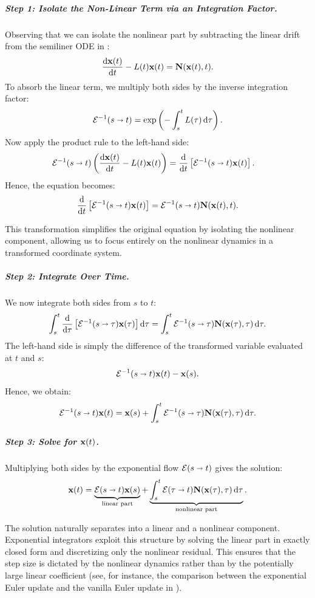 \subparagraph{Step 1: Isolate the Non-Linear Term via an Integration Factor.}
Observing that we can isolate the nonlinear part by subtracting the linear drift from the semiliner ODE in :
\[
\frac{\mathop{}\!\mathrm{d} {\mathbf{x}}(t)}{\mathop{}\!\mathrm{d} t} - L(t){\mathbf{x}}(t) = {\mathbf{N}}({\mathbf{x}}(t), t).
\]
To absorb the linear term, we multiply both sides by the inverse integration factor:
\[
\mathcal{E}^{-1}(s \shortrightarrow t) = \exp\left(-\int_s^t L(\tau)\mathop{}\!\mathrm{d} \tau \right).
\]
Now apply the product rule to the left-hand side:
\begin{align*}
\mathcal{E}^{-1}(s \shortrightarrow t) \left( \frac{\mathop{}\!\mathrm{d} {\mathbf{x}}(t)}{\mathop{}\!\mathrm{d} t} - L(t){\mathbf{x}}(t) \right)
&= \frac{\mathop{}\!\mathrm{d}}{\mathop{}\!\mathrm{d} t} \left[ \mathcal{E}^{-1}(s \shortrightarrow t) {\mathbf{x}}(t) \right].
\end{align*}
Hence, the equation becomes:
\[
\frac{\mathop{}\!\mathrm{d}}{\mathop{}\!\mathrm{d} t} \left[ \mathcal{E}^{-1}(s \shortrightarrow t) {\mathbf{x}}(t) \right]
= \mathcal{E}^{-1}(s \shortrightarrow t) {\mathbf{N}}({\mathbf{x}}(t), t).
\]

This transformation simplifies the original equation by isolating the nonlinear component, allowing us to focus entirely on the nonlinear dynamics in a transformed coordinate system.

\subparagraph{Step 2: Integrate Over Time.}
We now integrate both sides from $s$ to $t$:
\[
\int_s^t \frac{\mathop{}\!\mathrm{d}}{\mathop{}\!\mathrm{d} \tau} \left[ \mathcal{E}^{-1}(s \shortrightarrow \tau) {\mathbf{x}}(\tau) \right] \mathop{}\!\mathrm{d} \tau
= \int_s^t \mathcal{E}^{-1}(s \shortrightarrow \tau) {\mathbf{N}}({\mathbf{x}}(\tau), \tau)\mathop{}\!\mathrm{d} \tau.
\]
The left-hand side is simply the difference of the transformed variable evaluated at $t$ and $s$:
\[
\mathcal{E}^{-1}(s \shortrightarrow t) {\mathbf{x}}(t) - {\mathbf{x}}(s).
\]
Hence, we obtain:
\[
\mathcal{E}^{-1}(s \shortrightarrow t) {\mathbf{x}}(t)
= {\mathbf{x}}(s) + \int_s^t \mathcal{E}^{-1}(s \shortrightarrow \tau) {\mathbf{N}}({\mathbf{x}}(\tau), \tau)\mathop{}\!\mathrm{d} \tau.
\]

\subparagraph{Step 3: Solve for ${\mathbf{x}}(t)$.}
Multiplying both sides by the exponential flow $\mathcal{E}(s \shortrightarrow t)$ gives the solution:
\begin{align}\label{eq:exp-int-factor-integration}
    {\mathbf{x}}(t) = \underbrace{\mathcal{E}(s \shortrightarrow t)  {\mathbf{x}}(s)}_{\text{linear part}} + \underbrace{\int_s^t \mathcal{E}(\tau \shortrightarrow t) {\mathbf{N}}({\mathbf{x}}(\tau), \tau)\mathop{}\!\mathrm{d} \tau}_{\text{nonlinear part}} .
\end{align}

The solution naturally separates into a linear and a nonlinear component. Exponential integrators exploit this structure by solving the linear part in exactly closed form and discretizing only the nonlinear residual. This ensures that the step size is dictated by the nonlinear dynamics rather than by the potentially large linear coefficient (see, for instance, the comparison between the exponential Euler update and the vanilla Euler update in ).  


